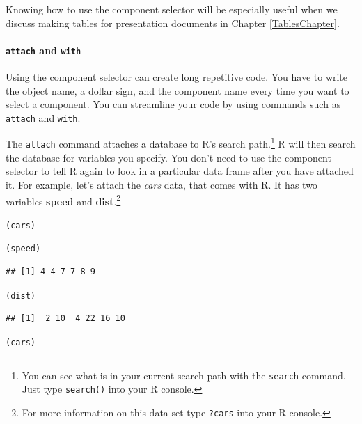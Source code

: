 \documentclass[krantz1]{krantz}
\begin{document}
\noindent Knowing how to use the component selector will be especially useful when we discuss making tables for presentation documents in Chapter \ref{TablesChapter}.

\paragraph{{\tt{attach}} and {\tt{with}}}

Using the component selector can create long repetitive code. You have to write the object name, a dollar sign, and the component name every time you want to select a component. You can streamline your code by using commands such as \texttt{attach} and \texttt{with}. 

The \texttt{attach} command attaches a database to R's search path.\footnote{You can see what is in your current search path with the \texttt{search} command. Just type \texttt{search()} into your R console.} R will then search the database for variables you specify. You don't need to use the component selector to tell R again to look in a particular data frame after you have attached it. For example, let's attach the \emph{cars} data, that comes with R. It has two variables \textbf{speed} and \textbf{dist}.\footnote{For more information on this data set type \texttt{?cars} into your R console.}

{\small
\begin{knitrout}
\color{fgcolor}\begin{kframe}
\begin{alltt}
(cars)

(speed)
\end{alltt}
\begin{verbatim}
## [1] 4 4 7 7 8 9
\end{verbatim}
\begin{alltt}

(dist)
\end{alltt}
\begin{verbatim}
## [1]  2 10  4 22 16 10
\end{verbatim}
\begin{alltt}

(cars)
\end{alltt}
\end{kframe}
\end{knitrout}

}
\end{document}
